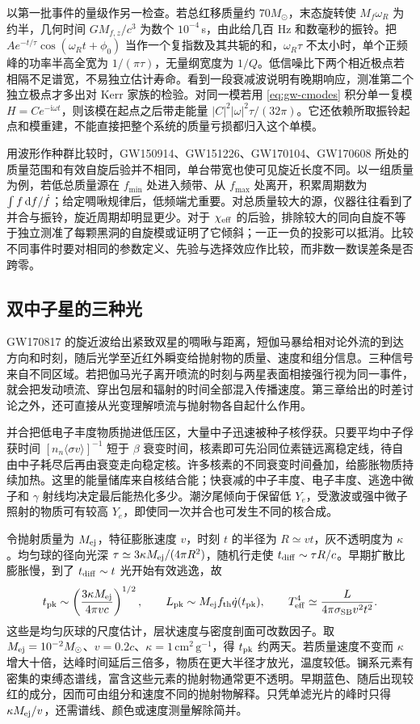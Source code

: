 以第一批事件的量级作另一检查。若总红移质量约 $70M_\odot$，末态旋转使 $M_f\omega_R$ 为约半，几何时间 $G M_{f,z}/c^3$ 为数个 $10^{-4}$\,s，由此给几百 Hz 和数毫秒的振铃。把 $A e^{-t/\tau}\cos(\omega_Rt+\phi_0)$ 当作一个复指数及其共轭的和，$\omega_R\tau$ 不太小时，单个正频峰的功率半高全宽为 $1/(\pi\tau)$，无量纲宽度为 $1/Q$。低信噪比下两个相近极点若相隔不足谱宽，不易独立估计寿命。看到一段衰减波说明有晚期响应，测准第二个独立极点才多出对 Kerr 家族的检验。对同一模若用 \eqref{eq:gw-cmodes} 积分单一复模 $H=C e^{-\mathrm i\omega t}$，则该模在起点之后带走能量 $|C|^2|\omega|^2\tau/(32\pi)$。它还依赖所取振铃起点和模重建，不能直接把整个系统的质量亏损都归入这个单模。

用波形作种群比较时，GW150914、GW151226、GW170104、GW170608 所处的质量范围和有效自旋后验并不相同，单台带宽也使可见旋近长度不同。以一组质量为例，若低总质量源在 $f_{\min}$ 处进入频带、从 $f_{\max}$ 处离开，积累周期数为 $\int f\,\dd f/\dot f$；给定啁啾规律后，低频端尤重要。对总质量较大的源，仪器往往看到了并合与振铃，旋近周期却明显更少。对于 $\chi_{\rm eff}$ 的后验，排除较大的同向自旋不等于独立测准了每颗黑洞的自旋模或证明了它倾斜；一正一负的投影可以抵消。比较不同事件时要对相同的参数定义、先验与选择效应作比较，而非数一数误差条是否跨零。

\subsection{双中子星的三种光}

GW170817 的旋近波给出紧致双星的啁啾与距离，短伽马暴给相对论外流的到达方向和时刻，随后光学至近红外瞬变给抛射物的质量、速度和组分信息。三种信号来自不同区域。若把伽马光子离开喷流的时刻与两星表面相接强行视为同一事件，就会把发动喷流、穿出包层和辐射的时间全部混入传播速度。第三章给出的时差讨论之外，还可直接从光变理解喷流与抛射物各自起什么作用。

并合把低电子丰度物质抛进低压区，大量中子迅速被种子核俘获。只要平均中子俘获时间 $[n_n\langle\sigma v\rangle]^{-1}$ 短于 $\beta$ 衰变时间，核素即可先沿同位素链远离稳定线，待自由中子耗尽后再由衰变走向稳定核。许多核素的不同衰变时间叠加，给膨胀物质持续加热。这里的能量储库来自核结合能；快衰减的中子丰度、电子丰度、逃逸中微子和 $\gamma$ 射线均决定最后能热化多少。潮汐尾倾向于保留低 $Y_e$，受激波或强中微子照射的物质可有较高 $Y_e$，即使同一次并合也可发生不同的核合成。

令抛射质量为 $M_{\rm ej}$，特征膨胀速度 $v$，时刻 $t$ 的半径为 $R\simeq vt$，灰不透明度为 $\kappa$。均匀球的径向光深 $\tau\simeq3\kappa M_{\rm ej}/(4\pi R^2)$，随机行走使 $t_{\rm diff}\sim\tau R/c$。早期扩散比膨胀慢，到了 $t_{\rm diff}\sim t$ 光开始有效逃逸，故
\[
 t_{\rm pk}\sim\left(\frac{3\kappa M_{\rm ej}}{4\pi vc}\right)^{1/2},
 \qquad L_{\rm pk}\sim M_{\rm ej} f_{\rm th}\dot q(t_{\rm pk}),\qquad
 T_{\rm eff}^4\simeq\frac{L}{4\pi\sigma_{\rm SB}v^2t^2}.
\]
这些是均匀灰球的尺度估计，层状速度与密度剖面可改数因子。取 $M_{\rm ej}=10^{-2}M_\odot$、$v=0.2c$、$\kappa=1\,\mathrm{cm^2\,g^{-1}}$，得 $t_{\rm pk}$ 约两天。若质量速度不变而 $\kappa$ 增大十倍，达峰时间延后三倍多，物质在更大半径才放光，温度较低。镧系元素有密集的束缚态谱线，富含这些元素的抛射物通常更不透明。早期蓝色、随后出现较红的成分，因而可由组分和速度不同的抛射物解释。只凭单滤光片的峰时只得 $\kappa M_{\rm ej}/v$，还需谱线、颜色或速度测量解除简并。

